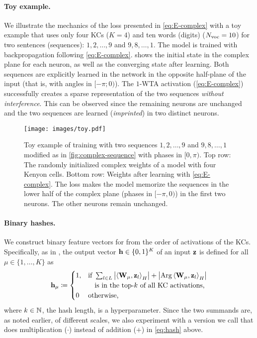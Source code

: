 \paragraph{Toy example.}\label{ss:toy}
We illustrate the mechanics of the loss presented in \cref{eq:E-complex} with a toy example that uses only four KCs ($K=4$) and ten words (digits) ($N_{\text{voc}}=10$) for two sentences (sequences): $1,2,\dotsc,9$ and $9,8,\dotsc,1$. The model is trained with backpropagation following \cref{eq:E-complex}.
 shows the initial state in the complex plane for each neuron, as well as the converging state after learning.
Both sequences are explicitly learned in the network in the opposite half-plane of the input (that is, with angles in $[-\pi;0)$). 
The $1$-WTA activation (\cref{eq:E-complex}) successfully creates a sparse representation of the two sequences \textit{without interference}. 
This can be observed since the remaining neurons are unchanged and the two sequences are learned (\textit{imprinted}) in two distinct neurons.

\begin{figure*}[tb]
    \centering
    \texttt{[image: images/toy.pdf]}
    \caption{Toy example of training with two sequences $1,2,\dotsc,9$ and $9,8,\dotsc,1$ modified as in \cref{fig:complex-sequence} with phases in $[0, \pi)$.
    Top row: The randomly initialized complex weights of a model with four Kenyon cells.
    Bottom row: Weights after learning with \cref{eq:E-complex}. The loss makes the model memorize the sequences in the lower half of the complex plane (phases in $[-\pi,0)$) in the first two neurons.
    The other neurons remain unchanged.}
    \label{fig:toy}
\end{figure*}

\paragraph{Binary hashes.}
\label{ss:hashes}
We construct binary feature vectors for \methodname from the order of activations of the KCs.
Specifically, as in \cite{biohash}, the output vector $\boldsymbol{\mathbf{h}} \in \{0,1\}^K$ of an input $\boldsymbol{\mathbf{z}}$ is defined for all $\mu \in\{1,\dotsc,K\}$ as
\begin{equation}
    \boldsymbol{\mathbf{h}}_\mu \coloneqq
    \begin{cases}
        1, & \text{if } \sum_{l \in L}{\left\lvert \left\langle\boldsymbol{\mathbf{W}}_{\mu}, \boldsymbol{\mathbf{z}}_{l} \right\rangle_H \right\rvert + \left\lvert \operatorname{Arg}\left\langle\boldsymbol{\mathbf{W}}_{\mu}, \boldsymbol{\mathbf{z}}_l\right\rangle_H\right\rvert} \\ & \hphantom{if }\text{is in the top-$k$ of all KC activations,}\\
        0 & \text{otherwise,}
    \end{cases}
    \label{eq:hash}
\end{equation}
where $k \in \mathbb{N}$, the hash length, is a hyperparameter.
Since the two summands are, as noted earlier, of different scales, we also experiment with a version we call \methodnametwo that does multiplication ($\cdot$) instead of addition ($+$) in \cref{eq:hash} above.